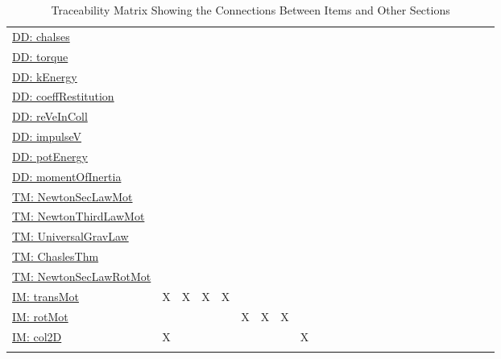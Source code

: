 \documentclass[12pt]{article}
\begin{document}
\begin{longtable}{l l l l l l l l l l l l l l l l l l l l l l l l l}
\hyperref[DD:chalses]{DD: chalses} &  &  &  &  &  &  &  &  &  &  &  &  &  &  &  &  &  &  &  &  &  &  &  & 
\\
\hyperref[DD:torque]{DD: torque} &  &  &  &  &  &  &  &  &  &  &  &  &  &  &  &  &  &  &  &  &  &  &  & 
\\
\hyperref[DD:kEnergy]{DD: kEnergy} &  &  &  &  &  &  &  &  &  &  &  &  &  &  &  &  &  &  &  &  &  &  &  & 
\\
\hyperref[DD:coeffRestitution]{DD: coeffRestitution} &  &  &  &  &  &  &  &  &  &  &  &  &  &  &  &  &  &  &  &  &  &  &  & 
\\
\hyperref[DD:reVeInColl]{DD: reVeInColl} &  &  &  &  &  &  &  &  &  &  &  &  &  &  &  &  &  &  &  &  &  &  &  & 
\\
\hyperref[DD:impulseV]{DD: impulseV} &  &  &  &  &  &  &  &  &  &  &  &  &  &  &  &  &  &  &  &  &  &  &  & 
\\
\hyperref[DD:potEnergy]{DD: potEnergy} &  &  &  &  &  &  &  &  &  &  &  &  &  &  &  &  &  &  &  &  &  &  &  & 
\\
\hyperref[DD:momentOfInertia]{DD: momentOfInertia} &  &  &  &  &  &  &  &  &  &  &  &  &  &  &  &  &  &  &  &  &  &  &  & 
\\
\hyperref[TM:NewtonSecLawMot]{TM: NewtonSecLawMot} &  &  &  &  &  &  &  &  &  &  &  &  &  &  &  &  &  &  &  &  &  &  &  & 
\\
\hyperref[TM:NewtonThirdLawMot]{TM: NewtonThirdLawMot} &  &  &  &  &  &  &  &  &  &  &  &  &  &  &  &  &  &  &  &  &  &  &  & 
\\
\hyperref[TM:UniversalGravLaw]{TM: UniversalGravLaw} &  &  &  &  &  &  &  &  &  &  &  &  &  &  &  &  &  &  &  &  &  &  &  & 
\\
\hyperref[TM:ChaslesThm]{TM: ChaslesThm} &  &  &  &  &  &  &  &  &  &  &  &  &  &  &  &  &  &  &  &  &  &  &  & 
\\
\hyperref[TM:NewtonSecLawRotMot]{TM: NewtonSecLawRotMot} &  &  &  &  &  &  &  &  &  &  &  &  &  &  &  &  &  &  &  &  &  &  &  & 
\\
\hyperref[IM:transMot]{IM: transMot} & X & X & X & X &  &  &  &  &  &  &  &  &  &  &  &  &  &  &  &  &  &  &  & 
\\
\hyperref[IM:rotMot]{IM: rotMot} &  &  &  &  & X & X & X &  &  &  &  &  &  &  &  &  &  &  &  &  &  &  &  & 
\\
\hyperref[IM:col2D]{IM: col2D} & X &  &  &  &  &  &  & X &  &  &  &  &  &  &  &  &  &  &  &  &  &  &  & 
\\
\bottomrule
\caption{Traceability Matrix Showing the Connections Between Items and Other Sections}
\label{Table:TraceMatRefvsRef}
\end{longtable}
\end{document}
